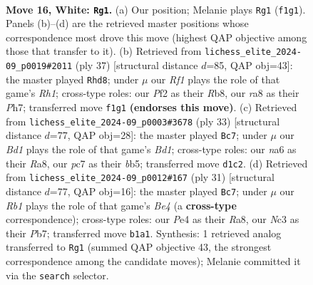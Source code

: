\documentclass[11pt]{article}
\begin{document}
\begin{figure}[p]
\label{fig:thought-m28}
\end{figure}

\clearpage

\begin{figure}[p]\centering
\begin{subfigure}{0.46\textwidth}\centering
\resizebox{\linewidth}{!}{%
\newchessgame
\chessboard[
  setfen={r4r2/pppb1kb1/n4pp1/4p2p/2P1P3/2N1BN2/PP3PP1/1R1BKR2 w - - 2 16},
  showmover=false,
  pgfstyle=straightmove, color=movearrow, markmove={f1-g1}
]}
\caption{}
\end{subfigure}\hfill
\begin{subfigure}{0.46\textwidth}\centering
\resizebox{\linewidth}{!}{%
\newchessgame
\chessboard[
  setfen={1r5r/2p1kppp/1p1bpn2/8/N1Pn4/P5PP/1P1B1P2/2RB1RK1 b - - 0 19},
  showmover=false,
  pgfstyle=straightmove, color=movearrow, markmove={h8-d8}
]}
\caption{}
\end{subfigure}
\\[4pt]
\begin{subfigure}{0.46\textwidth}\centering
\resizebox{\linewidth}{!}{%
\newchessgame
\chessboard[
  setfen={r2b1rk1/1p3ppp/4bn2/1B6/Np2P3/1N3P2/1PP3PP/2KR3R b - - 1 17},
  showmover=false,
  pgfstyle=straightmove, color=movearrow, markmove={d8-c7}
]}
\caption{}
\end{subfigure}\hfill
\begin{subfigure}{0.46\textwidth}\centering
\resizebox{\linewidth}{!}{%
\newchessgame
\chessboard[
  setfen={r3r1k1/pp3ppp/2p1bn2/2B1b3/4P3/2N3P1/PP3PBP/R2R2K1 b - - 0 16},
  showmover=false,
  pgfstyle=straightmove, color=movearrow, markmove={e5-c7}
]}
\caption{}
\end{subfigure}
\caption{\textbf{Move 16, White: \texttt{Rg1}.} (a) Our position; Melanie plays \texttt{Rg1} (\texttt{f1g1}). Panels (b)--(d) are the retrieved master positions whose correspondence most drove this move (highest QAP objective among those that transfer to it). (b) Retrieved from \texttt{lichess\_elite\_2024-09\_p0019\#2011} (ply 37) [structural distance $d$=85, QAP obj=43]: the master played \texttt{Rhd8}; under $\mu$ our \emph{Rf1} plays the role of that game's \emph{Rh1}; cross-type roles: our \emph{P}f2 as their \emph{R}b8, our \emph{r}a8 as their \emph{P}h7; transferred move \texttt{f1g1} \textbf{(endorses this move)}. (c) Retrieved from \texttt{lichess\_elite\_2024-09\_p0003\#3678} (ply 33) [structural distance $d$=77, QAP obj=28]: the master played \texttt{Bc7}; under $\mu$ our \emph{Bd1} plays the role of that game's \emph{Bd1}; cross-type roles: our \emph{n}a6 as their \emph{R}a8, our \emph{p}c7 as their \emph{b}b5; transferred move \texttt{d1c2}. (d) Retrieved from \texttt{lichess\_elite\_2024-09\_p0012\#167} (ply 31) [structural distance $d$=77, QAP obj=16]: the master played \texttt{Bc7}; under $\mu$ our \emph{Rb1} plays the role of that game's \emph{Be4} (a \textbf{cross-type} correspondence); cross-type roles: our \emph{P}e4 as their \emph{R}a8, our \emph{N}c3 as their \emph{P}b7; transferred move \texttt{b1a1}. Synthesis: 1 retrieved analog transferred to \texttt{Rg1} (summed QAP objective 43, the strongest correspondence among the candidate moves); Melanie committed it via the \texttt{search} selector.}

\end{figure}
\end{document}
